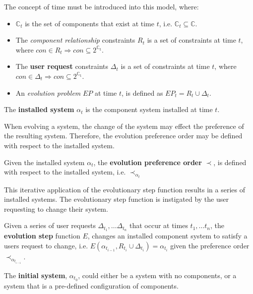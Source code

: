 The concept of time must be introduced into this model, where:
\begin{itemize}
  \item $\mathbb{C}_t$ is the set of components that exist at time $t$, i.e. $\mathbb{C}_t \subseteq \mathbb{C}$.
  \item The \textit{component relationship} constraints $R_t$ is a set of constraints at time $t$, where $con \in R_t \Rightarrow con \subseteq 2^{\mathbb{C_t}}$.
  \item The \textbf{user request} constraints $\Delta_t$ is a set of constraints at time $t$, where $con \in \Delta_t \Rightarrow con \subseteq 2^{\mathbb{C_t}}$.
  \item An \textit{evolution problem} $EP$ at time $t$, is defined as $EP_t = R_t \cup \Delta_t$.
\end{itemize}

\begin{defs}
The \textbf{installed system} $\alpha_t$ is the component system installed at time $t$.
\end{defs}

When evolving a system, the change of the system may effect the preference of the resulting system.
Therefore, the evolution preference order may be defined with respect to the installed system.
\begin{defs}
Given the installed system $\alpha_t$, the \textbf{evolution preference order} $\prec$, is defined with respect to the installed system, i.e. $\prec_{\alpha_t}$
\end{defs}

This iterative application of the evolutionary step function results in a series of installed systems.
The evolutionary step function is instigated by the user requesting to change their system.
\begin{defs}
Given a series of user requests $\Delta_{t_1},\ldots \Delta_{t_n}$ that occur at times $t_1,\ldots t_n$, 
the \textbf{evolution step} function $E$, changes an installed component system to satisfy a users request to change,
i.e. $E(\alpha_{t_{i-1}}, R_{t_i} \cup \Delta_{t_i}) = \alpha_{t_i}$ given the preference order $\prec_{\alpha_{t_{i-1}}}$.
\end{defs}

\begin{defs}
The \textbf{initial system}, $\alpha_{t_0}$, could either be a system with no components, or a system that is a pre-defined configuration of components.
\end{defs}

